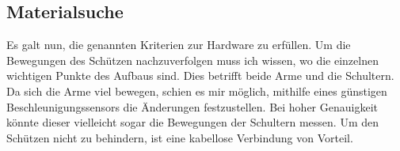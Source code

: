 \subsection{Materialsuche}
Es galt nun, die genannten Kriterien zur Hardware zu erfüllen. Um die Bewegungen des 
Schützen nachzuverfolgen muss ich wissen, wo die einzelnen wichtigen Punkte des Aufbaus 
sind. Dies betrifft beide Arme und die Schultern. Da sich die Arme viel bewegen, schien es mir 
möglich, mithilfe eines günstigen Beschleunigungssensors die Änderungen festzustellen. Bei 
hoher Genauigkeit könnte dieser vielleicht sogar die Bewegungen der Schultern messen.
Um den Schützen nicht zu behindern, ist eine kabellose Verbindung von Vorteil.

